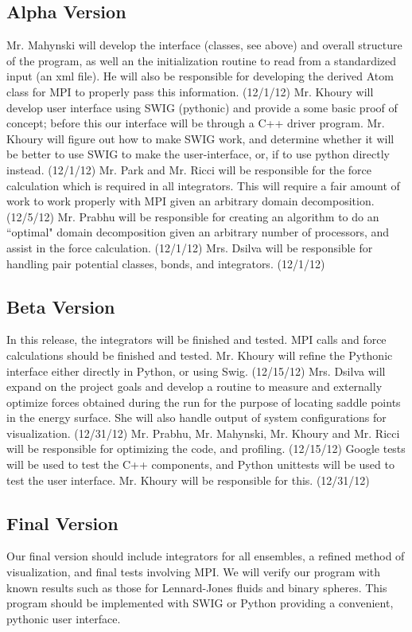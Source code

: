 \documentclass[10pt]{article}
\begin{document}
\subsection{Alpha Version}
Mr. Mahynski will develop the interface (classes, see above) and overall structure of the program, as well an the initialization routine to read from a standardized input (an xml file).  He will also be responsible for developing the derived Atom class for MPI to properly pass this information. (12/1/12)
Mr. Khoury will develop user interface using SWIG (pythonic) and provide a some basic proof of concept; before this our interface will be through a C++ driver program. Mr. Khoury will figure out how to make SWIG work, and determine whether it will be better to use SWIG to make the user-interface, or, if to use python directly instead. (12/1/12)
Mr. Park and Mr. Ricci will be responsible for the force calculation which is required in all integrators.  This will require a fair amount of work to work properly with MPI given an arbitrary domain decomposition. (12/5/12)
Mr. Prabhu will be responsible for creating an algorithm to do an ``optimal" domain decomposition given an arbitrary number of processors, and assist in the force calculation.  (12/1/12)
Mrs. Dsilva will be responsible for handling pair potential classes, bonds, and integrators.  (12/1/12)
\subsection{Beta Version}
In this release, the integrators will be finished and tested.  MPI calls and force calculations should be finished and tested.
Mr. Khoury will refine the Pythonic interface either directly in Python, or using Swig.  (12/15/12)
Mrs. Dsilva will expand on the project goals and develop a routine to measure and externally optimize forces obtained during the run for the purpose of locating saddle points in the energy surface.  She will also handle output of system configurations for visualization.  (12/31/12)
Mr. Prabhu, Mr. Mahynski, Mr. Khoury and Mr. Ricci will  be responsible for optimizing the code, and profiling. (12/15/12)
Google tests will be used to test the C++ components, and Python unittests will be used to test the user interface. Mr. Khoury will be responsible for this. (12/31/12)
\subsection{Final Version}
Our final version should include integrators for all ensembles, a refined method of visualization, and final tests involving MPI.  We will verify our program with known results such as those for Lennard-Jones fluids and binary spheres.  This program should be implemented with SWIG or Python providing a convenient, pythonic user interface.
\end{document}
